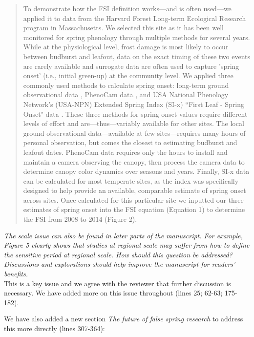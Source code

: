 \documentclass[11pt,a4paper]{article}
\begin{document}
\begin{quotation}
To demonstrate how the FSI definition works---and is often used---we applied it to data from the Harvard Forest Long-term Ecological Research program in Massachusetts. We selected this site as it has been well monitored for spring phenology through multiple methods for several years. While at the physiological level, frost damage is most likely to occur between budburst and leafout, data on the exact timing of these two events are rarely available and surrogate data are often used to capture 'spring onset' (i.e., initial green-up) at the community level. We applied three commonly used methods to calculate spring onset: long-term ground observational data \citep{Okeefe2014}, PhenoCam data \citep{Richardson2015}, and USA National Phenology Network's (USA-NPN) Extended Spring Index (SI-x) ``First Leaf - Spring Onset" data \citep{USA-NPN2016}. These three methods for spring onset values require different levels of effort and are---thus---variably available for other sites. The local ground observational data---available at few sites---requires many hours of personal observation, but comes the closest to estimating budburst and leafout dates. PhenoCam data requires only the hours to install and maintain a camera observing the canopy, then process the camera data to determine canopy color dynamics over seasons and years. Finally, SI-x data can be calculated for most temperate sites, as the index was specifically designed to help provide an available, comparable estimate of spring onset across sites. Once calculated for this particular site we inputted our three estimates of spring onset into the FSI equation (Equation 1) to determine the FSI from 2008 to 2014 (Figure 2). 
\end{quotation}


\textit{The scale issue can also be found in later parts of the manuscript. For example, Figure 5 clearly shows that studies at regional scale may suffer from how to define the sensitive period at regional scale. How should this question be addressed? Discussions and explorations should help improve the manuscript for readers' benefits.} \\

This is a key issue and we agree with the reviewer that further discussion is necessary. We have added more on this issue throughout (lines 25; 62-63; 175-182). 

We have also added a new section \textit{The future of false spring research} to address this more directly (lines 307-364):\\
\end{document}

